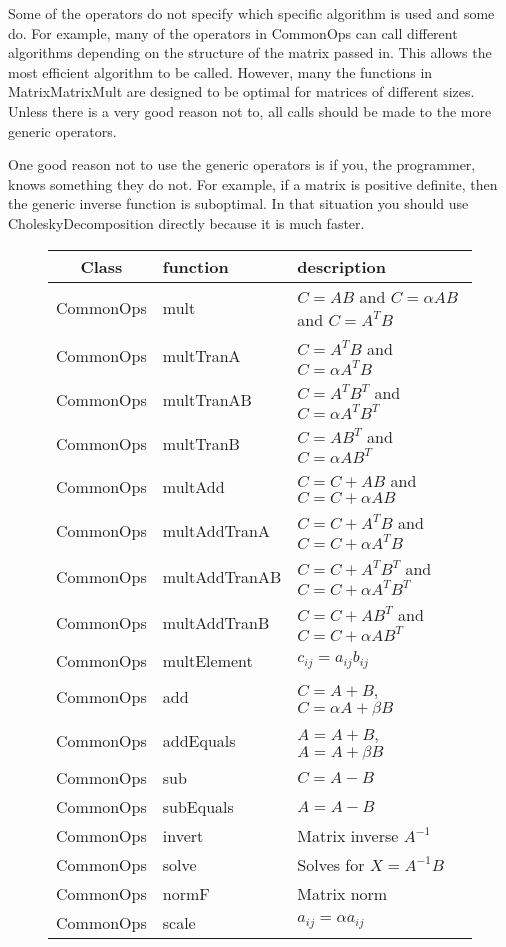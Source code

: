 \documentclass[12pt]{article}%
\begin{document}
Some of the operators do not specify which specific algorithm is used and some do.  For example, many of the operators in CommonOps can call different algorithms depending on the structure of the matrix passed in.  This allows the most efficient algorithm to be called.  However, many the functions in MatrixMatrixMult are designed to be optimal for matrices of different sizes.  Unless there is a very good reason not to, all calls should be made to the more generic operators. 

One good reason not to use the generic operators is if you, the programmer, knows something they do not.  For example, if a matrix is positive definite, then the generic inverse function is suboptimal.  In that situation you should use CholeskyDecomposition directly because it is much faster.

\begin{figure}[h]
\begin{tabular}{cll}
Class & function & description \\
\hline
CommonOps & mult & $C = AB$ and $C = \alpha AB$ and $C = A^TB$ \\ 
CommonOps & multTranA & $C = A^TB$ and $C = \alpha A^TB$\\
CommonOps & multTranAB & $C = A^TB^T$ and $C = \alpha A^TB^T$\\
CommonOps & multTranB & $C = AB^T$ and $C = \alpha AB^T$\\
CommonOps & multAdd & $C = C+AB$ and $C = C+\alpha AB$\\
CommonOps & multAddTranA & $C = C+A^TB$ and $C = C+\alpha A^TB$\\
CommonOps & multAddTranAB & $C = C+A^TB^T$ and $C = C+\alpha A^TB^T$\\
CommonOps & multAddTranB & $C = C+AB^T$ and $C = C+\alpha AB^T$\\
CommonOps & multElement & $c_{ij} = a_{ij} b_{ij}$ \\
CommonOps & add & $C = A+B$, $C = \alpha A+\beta B$\\
CommonOps & addEquals & $A = A+B$, $A = A + \beta B$\\
CommonOps & sub & $C = A-B$ \\
CommonOps & subEquals & $A = A-B$\\
CommonOps & invert & Matrix inverse $A^{-1}$\\
CommonOps & solve & Solves for $X = A^{-1} B$\\
CommonOps & normF & Matrix norm \\
CommonOps & scale & $a_{ij} = \alpha a_{ij}$ \\

\end{tabular}
\end{figure}
\end{document}
